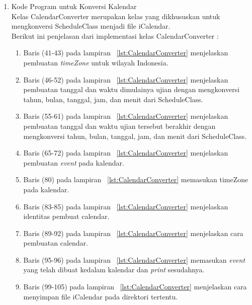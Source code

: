 \begin{enumerate}
\item Kode Program untuk Konversi Kalendar \\
Kelas CalendarConverter merupakan kelas yang dikhususkan untuk mengkonversi ScheduleClass menjadi file iCalendar. \\
Berikut ini penjelasan dari implementasi kelas CalendarConverter :
\begin{enumerate}
	\item Baris (41-43) pada lampiran ~\ref{lst:CalendarConverter} menjelaskan pembuatan \textit{timeZone} untuk wilayah Indonesia.
	\item Baris (46-52) pada lampiran ~\ref{lst:CalendarConverter} menjelaskan pembuatan tanggal dan waktu dimulainya ujian dengan mengkonversi tahun, bulan, tanggal, jam, dan menit dari ScheduleClass.
	\item Baris (55-61) pada lampiran ~\ref{lst:CalendarConverter} menjelaskan pembuatan tanggal dan waktu ujian tersebut berakhir dengan mengkonversi tahun, bulan, tanggal, jam, dan menit dari ScheduleClass.
	\item Baris (65-72) pada lampiran ~\ref{lst:CalendarConverter} menjelaskan pembuatan \textit{event} pada kalendar.
	\item Baris (80) pada lampiran ~\ref{lst:CalendarConverter} memasukan timeZone pada kalendar.
	\item Baris (83-85) pada lampiran ~\ref{lst:CalendarConverter} menjelaskan identitas pembuat calendar.
	\item Baris (89-92) pada lampiran ~\ref{lst:CalendarConverter} menjelaskan cara pembuatan calendar.
	\item Baris (95-96) pada lampiran ~\ref{lst:CalendarConverter} memasukan \textit{event} yang telah dibuat kedalam kalendar dan \textit{print} sesudahnya.
	\item Baris (99-105) pada lampiran ~\ref{lst:CalendarConverter} menjelaskan cara menyimpan file iCalendar pada direktori tertentu.
\end{enumerate}


\end{enumerate}
